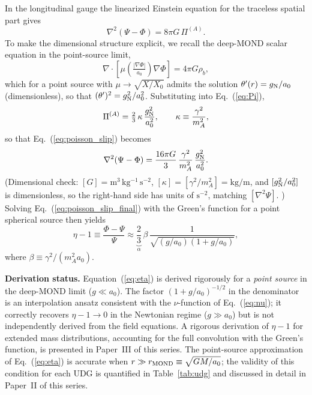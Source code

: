 \documentclass[aps,prd,twocolumn,showpacs,superscriptaddress]{revtex4-2}
\newcommand{\aO}{a_0}
\newcommand{\Xzero}{X_0}
\newcommand{\gN}{g_{\rm N}}
\begin{document}
In the longitudinal gauge the linearized Einstein equation for the
traceless spatial part gives
\begin{equation}
  \nabla^2(\Psi-\Phi) = 8\pi G\,\Pi^{(A)}.
  \label{eq:poisson_slip}
\end{equation}
To make the dimensional structure explicit, we recall the
deep-MOND scalar equation in the point-source limit,
\begin{equation}
  \nabla\cdot\!\left[\mu\!\left(\tfrac{|\nabla\Phi|}{\aO}\right)\nabla\Phi\right]
  = 4\pi G\rho_b,
\end{equation}
which for a point source with $\mu \to \sqrt{X/\Xzero}$ admits the
solution $\theta'(r) = \gN/\aO$ (dimensionless), so that
$(\theta')^2 = \gN^2/\aO^2$. Substituting into Eq.~(\ref{eq:Pi}),
\begin{equation}
  \Pi^{(A)} = \tfrac{2}{3}\,\kappa\,\frac{\gN^2}{\aO^2},
  \qquad \kappa \equiv \frac{\gamma^2}{m_A^2},
\end{equation}
so that Eq.~(\ref{eq:poisson_slip}) becomes
\begin{equation}
  \nabla^2(\Psi-\Phi)
  = \frac{16\pi G}{3}\,\frac{\gamma^2}{m_A^2}\,\frac{\gN^2}{\aO^2}.
  \label{eq:poisson_slip_final}
\end{equation}
(Dimensional check: $[G]=\mathrm{m^3\,kg^{-1}\,s^{-2}}$,
$[\kappa]=[\gamma^2/m_A^2]=\mathrm{kg/m}$, and
$[\gN^2/\aO^2]$ is dimensionless, so the right-hand side has
units of $\mathrm{s^{-2}}$, matching $[\nabla^2\Psi]$. \checkmark)
Solving Eq.~(\ref{eq:poisson_slip_final}) with the Green's function
for a point spherical source then yields
\begin{equation}
  \eta - 1 \equiv \frac{\Phi-\Psi}{\Psi}
  \approx \underbrace{\frac{2}{3}}_{\alpha}\,\beta\,
  \frac{1}{\sqrt{(g/\aO)(1+g/\aO)}},
  \label{eq:eta}
\end{equation}
where $\beta \equiv \gamma^2/(m_A^2\aO)$.

\textbf{Derivation status.} Equation~(\ref{eq:eta}) is derived
rigorously for a \emph{point source} in the deep-MOND limit
($g \ll \aO$). The factor $(1+g/\aO)^{-1/2}$ in the denominator is
an interpolation ansatz consistent with the $\nu$-function of
Eq.~(\ref{eq:nu}); it correctly recovers $\eta - 1 \to 0$ in the
Newtonian regime ($g \gg \aO$) but is not independently derived from
the field equations. A rigorous derivation of $\eta-1$ for extended
mass distributions, accounting for the full convolution with the
Green's function, is presented in Paper~III of this series. The
point-source approximation of Eq.~(\ref{eq:eta}) is accurate when
$r \gg r_{\rm MOND} \equiv \sqrt{GM/\aO}$; the validity of this
condition for each UDG is quantified in Table~\ref{tab:udg} and
discussed in detail in Paper~II of this series.
\end{document}
